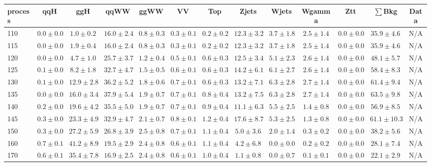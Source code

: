\begin{table}
{%
 \tiny
 \begin{center}
 \begin{tabular}{l | c c | c c c c c c c c  | c c}
 \hline
 process & qqH & ggH & qqWW & ggWW & VV & Top & Zjets & Wjets & Wgamma & Ztt & $\sum$Bkg & Data \\
 \hline
110 & $0.0\pm0.0$ & $1.0\pm0.2$ & $16.0\pm2.4$ & $0.8\pm0.3$ & $0.3\pm0.1$ & $0.2\pm0.2$ & $12.3\pm3.2$ & $3.7\pm1.8$ & $2.5\pm1.4$ & $0.0\pm0.0$ & $35.9\pm4.6$ & N/A \\
115 & $0.0\pm0.0$ & $1.9\pm0.4$ & $16.0\pm2.4$ & $0.8\pm0.3$ & $0.3\pm0.1$ & $0.2\pm0.2$ & $12.3\pm3.2$ & $3.7\pm1.8$ & $2.5\pm1.4$ & $0.0\pm0.0$ & $35.9\pm4.6$ & N/A \\
120 & $0.0\pm0.0$ & $4.7\pm1.0$ & $25.7\pm3.7$ & $1.2\pm0.4$ & $0.5\pm0.1$ & $0.6\pm0.3$ & $12.5\pm3.4$ & $5.1\pm2.3$ & $2.6\pm1.4$ & $0.0\pm0.0$ & $48.1\pm5.7$ & N/A \\
125 & $0.1\pm0.0$ & $8.2\pm1.8$ & $32.7\pm4.7$ & $1.5\pm0.5$ & $0.6\pm0.1$ & $0.6\pm0.3$ & $14.2\pm6.1$ & $6.1\pm2.7$ & $2.6\pm1.4$ & $0.0\pm0.0$ & $58.4\pm8.3$ & N/A \\
130 & $0.1\pm0.0$ & $12.9\pm2.8$ & $36.2\pm5.2$ & $1.8\pm0.6$ & $0.7\pm0.1$ & $0.6\pm0.3$ & $13.2\pm7.1$ & $6.3\pm2.8$ & $2.7\pm1.4$ & $0.0\pm0.0$ & $61.4\pm9.4$ & N/A \\
135 & $0.0\pm0.0$ & $16.0\pm3.4$ & $37.9\pm5.4$ & $1.9\pm0.7$ & $0.7\pm0.1$ & $0.8\pm0.4$ & $13.2\pm7.5$ & $6.3\pm2.8$ & $2.7\pm1.4$ & $0.0\pm0.0$ & $63.5\pm9.8$ & N/A \\
140 & $0.2\pm0.0$ & $19.6\pm4.2$ & $35.5\pm5.0$ & $1.9\pm0.7$ & $0.7\pm0.1$ & $0.9\pm0.4$ & $11.1\pm6.3$ & $5.5\pm2.5$ & $1.4\pm0.8$ & $0.0\pm0.0$ & $56.9\pm8.5$ & N/A \\
145 & $0.3\pm0.0$ & $23.3\pm4.9$ & $32.9\pm4.7$ & $2.1\pm0.7$ & $0.8\pm0.1$ & $1.2\pm0.4$ & $17.6\pm8.7$ & $5.3\pm2.5$ & $1.3\pm0.8$ & $0.0\pm0.0$ & $61.1\pm10.3$ & N/A \\
150 & $0.3\pm0.0$ & $27.2\pm5.9$ & $26.8\pm3.9$ & $2.5\pm0.8$ & $0.7\pm0.1$ & $1.1\pm0.4$ & $5.0\pm3.6$ & $2.0\pm1.4$ & $0.3\pm0.2$ & $0.0\pm0.0$ & $38.2\pm5.6$ & N/A \\
160 & $0.7\pm0.1$ & $41.2\pm8.9$ & $19.5\pm2.9$ & $2.4\pm0.8$ & $0.6\pm0.1$ & $1.1\pm0.4$ & $4.2\pm6.8$ & $0.0\pm0.0$ & $0.2\pm0.2$ & $0.0\pm0.0$ & $28.1\pm7.4$ & N/A \\
170 & $0.6\pm0.1$ & $35.4\pm7.8$ & $16.9\pm2.5$ & $2.4\pm0.8$ & $0.6\pm0.1$ & $1.0\pm0.4$ & $1.1\pm0.8$ & $0.0\pm0.7$ & $0.1\pm0.1$ & $0.0\pm0.0$ & $22.1\pm2.9$ & N/A \\

\end{tabular}
\end{center}}
\end{table}

